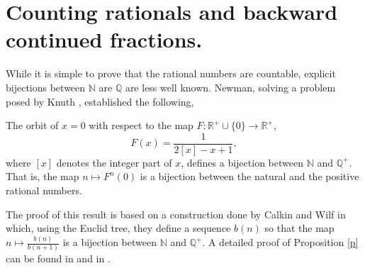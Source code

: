 \documentclass[letterpaper,10pt,reqno]{amsart}
\numberwithin{equation}{section}     %
\newcommand{\R}{\mathbb{R}}
\newcommand{\Z}{\mathbb{Z}}
\newcommand{\N}{\mathbb{N}}
\def\R{{\mathbb R}}
\def\N{{\mathbb N}}
\def\Z{{\mathbb Z}}
\def\Q{{\mathbb Q}}
\begin{document}
%
%
%

\section{Counting rationals and backward continued fractions.}  

While it is simple to prove that the rational numbers are countable, explicit bijections between $\N$ are $\Q$ are less well known. Newman, solving a problem posed by Knuth \cite{k}, established the following,
\begin{proposition} \label{p}
The orbit of $x=0$ with respect to the map $F:\R^+ \cup\{0\} \to \R^+$, 
\begin{equation*}
F(x)= \frac{1}{2[x] -x+1},
\end{equation*}
where $[x]$ denotes the integer part of $x$, defines a bijection between $\N$ and $\Q^+$. That is, the map $n  \mapsto F^n(0) $ is a bijection between the natural and the positive rational numbers.
\end{proposition}
The proof of this result is based on a construction done by Calkin and Wilf \cite{cw} in which, using  the Euclid tree, they define a sequence $b(n)$ so that the map $n \mapsto \frac{b(n)}{b(n+1)}$ is a bijection between $\N$ and $\Q^+$. A detailed proof of Proposition \ref{p} can be found in  \cite[Chapter 17]{az} and in \cite{msz}.
\end{document}
